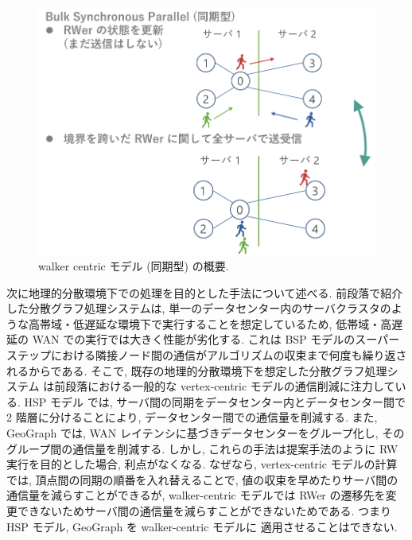 \begin{figure}[t]
    \centering
    \includegraphics[scale=0.7]{figure/walkercentric.pdf}
    \caption{walker centric モデル (同期型) の概要.}
    \label{walker centric モデル (同期型) の概要}
\end{figure}




次に地理的分散環境下での処理を目的とした手法について述べる. 前段落で紹介した分散グラフ処理システムは, 単一のデータセンター内のサーバクラスタのような高帯域・低遅延な環境下で実行することを想定しているため, 低帯域・高遅延の WAN での実行では大きく性能が劣化する. これは BSP モデルのスーパーステップにおける隣接ノード間の通信がアルゴリズムの収束まで何度も繰り返されるからである. そこで, 既存の地理的分散環境下を想定した分散グラフ処理システム\cite{8486361}\cite{10.1145/3397271.3401157} は前段落における一般的な vertex-centric モデルの通信削減に注力している. HSP モデル\cite{8486361} では, サーバ間の同期をデータセンター内とデータセンター間で 2 階層に分けることにより, データセンター間での通信量を削減する. また, GeoGraph\cite{10.1145/3397271.3401157} では, WAN レイテンシに基づきデータセンターをグループ化し, そのグループ間の通信量を削減する. しかし, これらの手法は提案手法のように RW 実行を目的とした場合, 利点がなくなる. なぜなら, vertex-centric モデルの計算では, 頂点間の同期の順番を入れ替えることで, 値の収束を早めたりサーバ間の通信量を減らすことができるが, walker-centric モデルでは RWer の遷移先を変更できないためサーバ間の通信量を減らすことができないためである. つまり HSP モデル, GeoGraph を walker-centric モデルに 適用させることはできない. 

